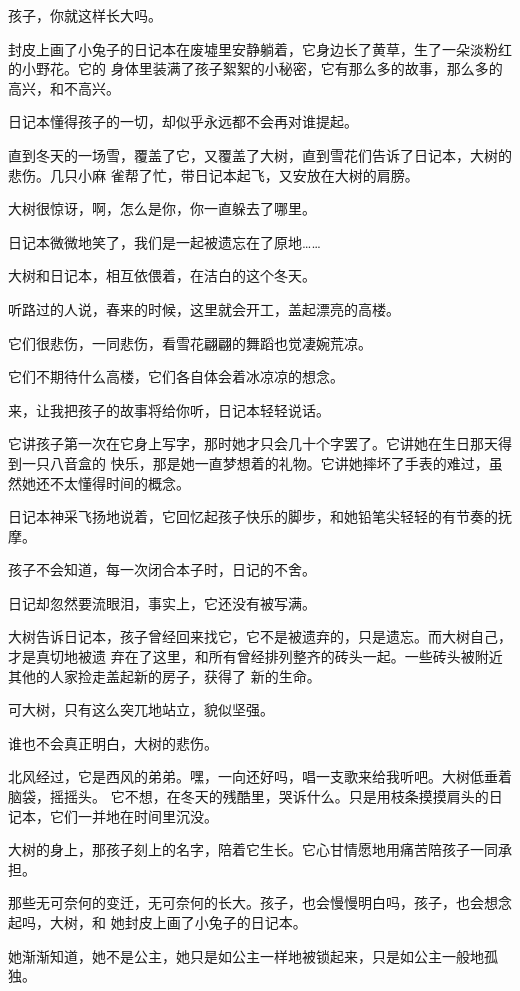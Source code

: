 \documentclass[12pt,a4paper]{article}
\begin{document}
		孩子，你就这样长大吗。

		封皮上画了小兔子的日记本在废墟里安静躺着，它身边长了黄草，生了一朵淡粉红的小野花。它的
	身体里装满了孩子絮絮的小秘密，它有那么多的故事，那么多的高兴，和不高兴。

		日记本懂得孩子的一切，却似乎永远都不会再对谁提起。

		直到冬天的一场雪，覆盖了它，又覆盖了大树，直到雪花们告诉了日记本，大树的悲伤。几只小麻
	雀帮了忙，带日记本起飞，又安放在大树的肩膀。

		大树很惊讶，啊，怎么是你，你一直躲去了哪里。

		日记本微微地笑了，我们是一起被遗忘在了原地……

		大树和日记本，相互依偎着，在洁白的这个冬天。

		听路过的人说，春来的时候，这里就会开工，盖起漂亮的高楼。


		它们很悲伤，一同悲伤，看雪花翩翩的舞蹈也觉凄婉荒凉。

		它们不期待什么高楼，它们各自体会着冰凉凉的想念。


		来，让我把孩子的故事将给你听，日记本轻轻说话。

		它讲孩子第一次在它身上写字，那时她才只会几十个字罢了。它讲她在生日那天得到一只八音盒的
	快乐，那是她一直梦想着的礼物。它讲她摔坏了手表的难过，虽然她还不太懂得时间的概念。

		日记本神采飞扬地说着，它回忆起孩子快乐的脚步，和她铅笔尖轻轻的有节奏的抚摩。

		孩子不会知道，每一次闭合本子时，日记的不舍。

		日记却忽然要流眼泪，事实上，它还没有被写满。

		大树告诉日记本，孩子曾经回来找它，它不是被遗弃的，只是遗忘。而大树自己，才是真切地被遗
	弃在了这里，和所有曾经排列整齐的砖头一起。一些砖头被附近其他的人家捡走盖起新的房子，获得了
	新的生命。

		可大树，只有这么突兀地站立，貌似坚强。

		谁也不会真正明白，大树的悲伤。


		北风经过，它是西风的弟弟。嘿，一向还好吗，唱一支歌来给我听吧。大树低垂着脑袋，摇摇头。
	它不想，在冬天的残酷里，哭诉什么。只是用枝条摸摸肩头的日记本，它们一并地在时间里沉没。

		大树的身上，那孩子刻上的名字，陪着它生长。它心甘情愿地用痛苦陪孩子一同承担。

		那些无可奈何的变迁，无可奈何的长大。孩子，也会慢慢明白吗，孩子，也会想念起吗，大树，和
	她封皮上画了小兔子的日记本。


		她渐渐知道，她不是公主，她只是如公主一样地被锁起来，只是如公主一般地孤独。
\end{document}
